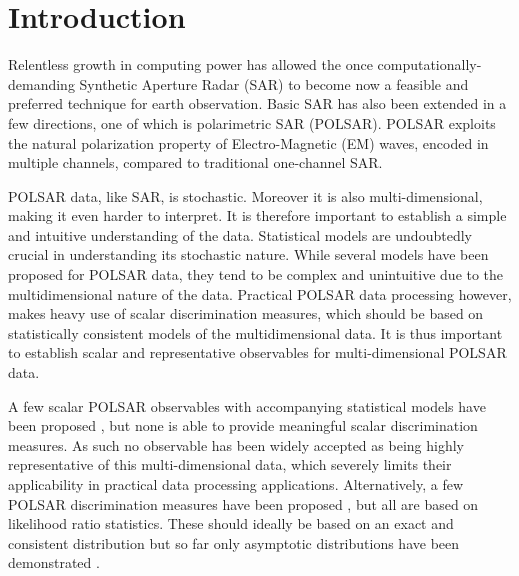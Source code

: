 \documentclass[printer]{tRSL2e}
\begin{document}
\section{Introduction}

Relentless growth in computing power has allowed the once computationally-demanding Synthetic Aperture Radar (SAR)
to become now a feasible and preferred technique for earth observation.
Basic SAR has also been extended in a few directions, one of which is polarimetric SAR (POLSAR).
POLSAR exploits the natural polarization property of Electro-Magnetic (EM) waves,
  encoded in multiple channels, compared to traditional one-channel SAR.
  

POLSAR data, like SAR, is stochastic.
Moreover it is also multi-dimensional, making it even harder to interpret.
It is therefore important to establish a simple and intuitive understanding of the data.
 Statistical models are undoubtedly crucial in understanding its stochastic nature.
While several %
models have been proposed for POLSAR data, they
   tend to be complex and unintuitive due to the multidimensional nature of the data.
Practical POLSAR data processing however, makes heavy use of scalar discrimination measures,
  which should be based on statistically consistent models %
  of the multidimensional data.
It is thus important to establish scalar and representative observables for multi-dimensional POLSAR data.
  

A few scalar POLSAR observables with accompanying statistical models have been proposed \citep{Conradsen_2003_TGRS_4, Alberga_2008_IJRS_4129, Joughin_1994_TGRS_562, Lee_1994_TGRS_1017, Touzi_1996_TGRS_519, Lopez-Martinez_2003_TGRS_2232, Erten_2012_Sensors_2766},
  but none is able to provide meaningful scalar discrimination measures.
As such no observable has been widely accepted as being highly representative of this multi-dimensional data,
  which severely limits their applicability in practical data processing applications.
Alternatively, a few POLSAR discrimination measures have been proposed \citep{Lee_1994_IJRS_2299, Anfinsen_2007_ESA_POLINSAR, Kersten_2005_TGRS_519, Lee_2011_IGARSS_3740, Cao_2007_TGRS_3454, Conradsen_2003_TGRS_4},
  but all are based on likelihood ratio statistics.
These should ideally be based on an exact and consistent distribution
  but so far only asymptotic distributions have been demonstrated \citep{Conradsen_2003_TGRS_4}.
\end{document}
